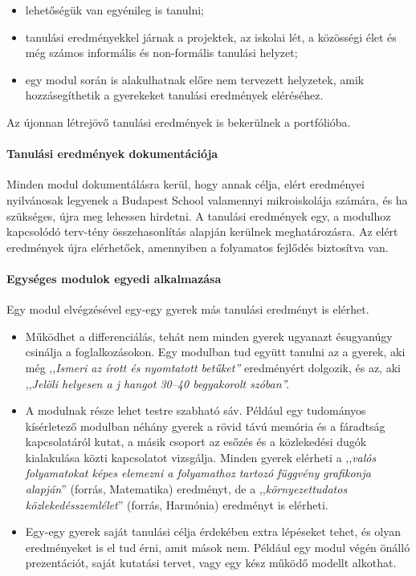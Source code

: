 \begin{itemize}
      \item lehetőségük van egyénileg is tanulni;

      \item tanulási eredményekkel járnak a projektek, az iskolai lét, a közösségi élet és még számos informális és non-formális tanulási helyzet;

      \item egy modul során is alakulhatnak előre nem tervezett helyzetek, amik hozzásegíthetik a gyerekeket tanulási eredmények eléréséhez.
\end{itemize}

Az újonnan létrejövő tanulási eredmények is bekerülnek a portfólióba.

\paragraph{Tanulási eredmények dokumentációja}

Minden modul dokumentálásra kerül, hogy annak célja, elért eredményei nyilvánosak legyenek a Budapest School valamennyi mikroiskolája számára, és ha szükséges, újra meg lehessen hirdetni. A tanulási eredmények egy, a modulhoz kapcsolódó terv-tény összehasonlítás alapján kerülnek meghatározásra. Az elért eredmények újra elérhetőek, amennyiben a folyamatos fejlődés biztosítva van.

\paragraph{Egységes modulok egyedi alkalmazása}

Egy modul elvégzésével egy-egy gyerek más tanulási eredményt is elérhet.

\begin{itemize}
      \item
            Működhet a differenciálás, tehát nem minden gyerek ugyanazt és\break ugyanúgy csinálja a foglalkozásokon. Egy modulban tud együtt	tanulni az a gyerek, aki még ,,\emph{Ismeri az írott és nyomtatott  betűket''} eredményért dolgozik, és az, aki ,,\emph{Jelöli helyesen a j	hangot 30--40 begyakorolt szóban''.}
      \item
            A modulnak része lehet testre szabható sáv. Például egy tudományos kísérletező modulban néhány gyerek a rövid távú memória és a	fáradtság kapcsolatáról kutat, a másik csoport az esőzés és a	közlekedési dugók kialakulása közti kapcsolatot vizsgálja. Minden  gyerek elérheti a ,,\emph{valós folyamatokat képes elemezni a folyamathoz tartozó függvény grafikonja alapján}''  (forrás, Matematika) eredményt, de a ,,\emph{környezettudatos közlekedésszemlélet}'' (forrás, Harmónia)	eredményt is elérheti.
      \item
            Egy-egy gyerek saját tanulási célja érdekében extra lépéseket tehet, és olyan eredményeket is el tud érni, amit mások nem.	Például egy modul végén önálló prezentációt, saját kutatási  tervet, vagy egy kész működő modellt alkothat.
\end{itemize}

